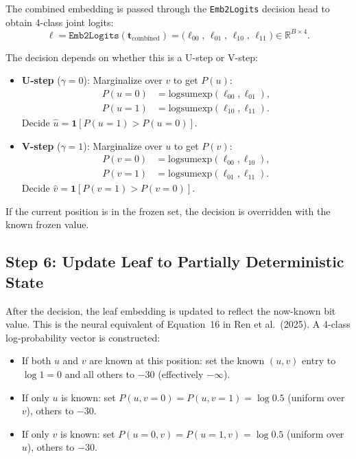 \documentclass[11pt,a4paper]{article}
\newcommand{\R}{\mathbb{R}}
\begin{document}
The combined embedding is passed through the \texttt{Emb2Logits} decision head to obtain 4-class joint logits:
\begin{equation}
    \bm{\ell} = \texttt{Emb2Logits}(\bm{t}_{\text{combined}}) = \bigl(\ell_{00},\, \ell_{01},\, \ell_{10},\, \ell_{11}\bigr) \in \R^{B \times 4}.
\end{equation}

The decision depends on whether this is a U-step or V-step:

\begin{itemize}
    \item \textbf{U-step} ($\gamma = 0$): Marginalize over $v$ to get $P(u)$:
    \begin{align}
        P(u = 0) &= \text{logsumexp}(\ell_{00}, \ell_{01}), \\
        P(u = 1) &= \text{logsumexp}(\ell_{10}, \ell_{11}).
    \end{align}
    Decide $\hat{u} = \mathbf{1}[P(u=1) > P(u=0)]$.

    \item \textbf{V-step} ($\gamma = 1$): Marginalize over $u$ to get $P(v)$:
    \begin{align}
        P(v = 0) &= \text{logsumexp}(\ell_{00}, \ell_{10}), \\
        P(v = 1) &= \text{logsumexp}(\ell_{01}, \ell_{11}).
    \end{align}
    Decide $\hat{v} = \mathbf{1}[P(v=1) > P(v=0)]$.
\end{itemize}

If the current position is in the frozen set, the decision is overridden with the known frozen value.

\subsection{Step 6: Update Leaf to Partially Deterministic State}

After the decision, the leaf embedding is updated to reflect the now-known bit value. This is the neural equivalent of Equation~16 in Ren et al.\ (2025). A 4-class log-probability vector is constructed:

\begin{itemize}
    \item If both $u$ and $v$ are known at this position: set the known $(u, v)$ entry to $\log 1 = 0$ and all others to $-30$ (effectively $-\infty$).
    \item If only $u$ is known: set $P(u, v{=}0) = P(u, v{=}1) = \log 0.5$ (uniform over $v$), others to $-30$.
    \item If only $v$ is known: set $P(u{=}0, v) = P(u{=}1, v) = \log 0.5$ (uniform over $u$), others to $-30$.
\end{itemize}
\end{document}
